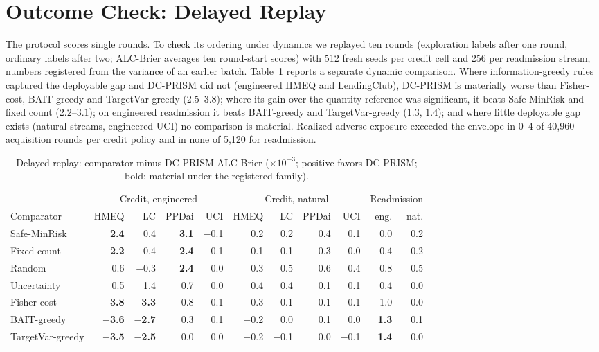 \documentclass[runningheads]{llncs}
\begin{document}
\section{Outcome Check: Delayed Replay}
\label{sec:replay}
The protocol scores single rounds. To check its ordering under dynamics we replayed ten rounds (exploration labels after one round, ordinary labels after two; ALC-Brier averages ten round-start scores) with 512 fresh seeds per credit cell and 256 per readmission stream, numbers registered from the variance of an earlier batch. Table~\ref{tab:replay} reports a separate dynamic comparison. Where information-greedy rules captured the deployable gap and DC-PRISM did not (engineered HMEQ and LendingClub), DC-PRISM is materially worse than Fisher-cost, BAIT-greedy and TargetVar-greedy ($2.5$--$3.8$); where its gain over the quantity reference was significant, it beats Safe-MinRisk and fixed count ($2.2$--$3.1$); on engineered readmission it beats BAIT-greedy and TargetVar-greedy ($1.3$, $1.4$); and where little deployable gap exists (natural streams, engineered UCI) no comparison is material. Realized adverse exposure exceeded the envelope in 0--4 of 40{,}960 acquisition rounds per credit policy and in none of 5{,}120 for readmission.

\begin{table}[t]
\caption{Delayed replay: comparator minus DC-PRISM ALC-Brier ($\times10^{-3}$; positive favors DC-PRISM; bold: material under the registered family).}
\label{tab:replay}
\centering\scriptsize
\setlength{\tabcolsep}{2.4pt}
\begin{tabular}{lrrrrrrrrrr}
\toprule
& \multicolumn{4}{c}{Credit, engineered} & \multicolumn{4}{c}{Credit, natural} & \multicolumn{2}{c}{Readmission} \\
\cmidrule(lr){2-5}\cmidrule(lr){6-9}\cmidrule(lr){10-11}
Comparator & HMEQ & LC & PPDai & UCI & HMEQ & LC & PPDai & UCI & eng. & nat. \\
\midrule
Safe-MinRisk & \textbf{2.4} & 0.4 & \textbf{3.1} & $-$0.1 & 0.2 & 0.2 & 0.4 & 0.1 & 0.0 & 0.2 \\
Fixed count & \textbf{2.2} & 0.4 & \textbf{2.4} & $-$0.1 & 0.1 & 0.1 & 0.3 & 0.0 & 0.4 & 0.2 \\
Random & 0.6 & $-$0.3 & \textbf{2.4} & 0.0 & 0.3 & 0.5 & 0.6 & 0.4 & 0.8 & 0.5 \\
Uncertainty & 0.5 & 1.4 & 0.7 & 0.0 & 0.4 & 0.4 & 0.1 & 0.1 & 0.4 & 0.0 \\
Fisher-cost & \textbf{$-$3.8} & \textbf{$-$3.3} & 0.8 & $-$0.1 & $-$0.3 & $-$0.1 & 0.1 & $-$0.1 & 1.0 & 0.0 \\
BAIT-greedy & \textbf{$-$3.6} & \textbf{$-$2.7} & 0.3 & 0.1 & $-$0.2 & 0.0 & 0.1 & 0.0 & \textbf{1.3} & 0.1 \\
TargetVar-greedy & \textbf{$-$3.5} & \textbf{$-$2.5} & 0.0 & 0.0 & $-$0.2 & $-$0.1 & 0.0 & $-$0.1 & \textbf{1.4} & 0.0 \\
\bottomrule
\end{tabular}
\end{table}
\end{document}
